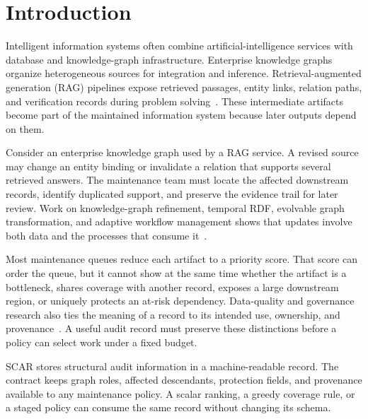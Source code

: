 \documentclass[pdflatex,sn-basic]{sn-jnl}
\begin{document}

\maketitle


\section{Introduction}
\label{sec:introduction}

Intelligent information systems often combine artificial-intelligence services with database and knowledge-graph infrastructure. Enterprise knowledge graphs organize heterogeneous sources for integration and inference. Retrieval-augmented generation (RAG) pipelines expose retrieved passages, entity links, relation paths, and verification records during problem solving~\citep{hogan2021knowledge,lewis2020rag,noy2019industry,pan2024unifying,studer1998knowledge}. These intermediate artifacts become part of the maintained information system because later outputs depend on them.

Consider an enterprise knowledge graph used by a RAG service. A revised source may change an entity binding or invalidate a relation that supports several retrieved answers. The maintenance team must locate the affected downstream records, identify duplicated support, and preserve the evidence trail for later review. Work on knowledge-graph refinement, temporal RDF, evolvable graph transformation, and adaptive workflow management shows that updates involve both data and the processes that consume it~\citep{ma2023temporalrdf,malburg2023mapek,paulheim2017knowledge,slifka2023evolvable}.

Most maintenance queues reduce each artifact to a priority score. That score can order the queue, but it cannot show at the same time whether the artifact is a bottleneck, shares coverage with another record, exposes a large downstream region, or uniquely protects an at-risk dependency. Data-quality and governance research also ties the meaning of a record to its intended use, ownership, and provenance~\citep{abraham2019data,higgins2008dcc,wang1996beyond}. A useful audit record must preserve these distinctions before a policy can select work under a fixed budget.

SCAR stores structural audit information in a machine-readable record. The contract keeps graph roles, affected descendants, protection fields, and provenance available to any maintenance policy. A scalar ranking, a greedy coverage rule, or a staged policy can consume the same record without changing its schema.
\end{document}
